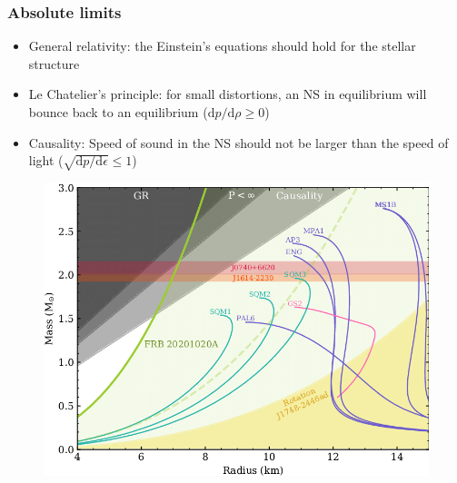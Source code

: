 \begin{frame}
\frametitle{Absolute limits}

\begin{itemize}
	\item General relativity: the Einstein's equations should hold for the stellar structure
	\item Le Chatelier's principle: for small distortions, an NS in equilibrium will bounce back to an equilibrium ($\mathrm{d}p / \mathrm{d} \rho \geq 0$)
	\item Causality: Speed of sound in the NS should not be larger than the speed of light ($\sqrt{\mathrm{d}p / \mathrm{d} \epsilon} \leq 1$)
\end{itemize}
\begin{figure}
	\centering
	\includegraphics[width=0.5\linewidth]{./images/ns-limiting-factors.png}
\end{figure}

\end{frame}